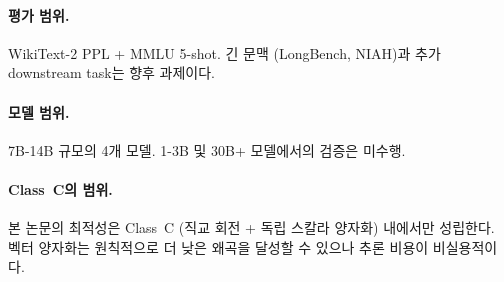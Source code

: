 \paragraph{평가 범위.} WikiText-2 PPL + MMLU 5-shot. 긴 문맥 (LongBench, NIAH)과 추가 downstream task는 향후 과제이다.

\paragraph{모델 범위.} 7B-14B 규모의 4개 모델. 1-3B 및 30B+ 모델에서의 검증은 미수행.

\paragraph{Class~C의 범위.} 본 논문의 최적성은 Class~C (직교 회전 + 독립 스칼라 양자화) 내에서만 성립한다. 벡터 양자화는 원칙적으로 더 낮은 왜곡을 달성할 수 있으나 추론 비용이 비실용적이다.
